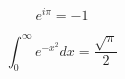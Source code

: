 \documentclass{article}
\begin{document}
\[
e^{i\pi} = -1
\]

\[
\int_0^\infty e^{-x^2} dx = \frac{\sqrt{\pi}}{2}
\]
\end{document}
